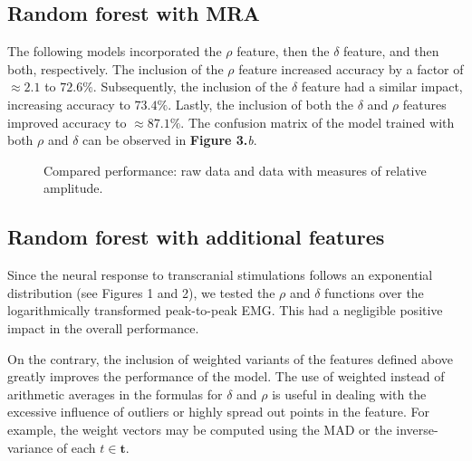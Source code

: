 \documentclass{article}
\begin{document}
\begin{multicols}{2}
\subsection{Random forest with MRA}

The following models incorporated the $\rho$ feature, then the $\delta$ feature,
and then both, respectively. The inclusion of the $\rho$ feature increased
accuracy by a factor of $\approx 2.1$ to $72.6\%$. Subsequently, the inclusion
of the $\delta$ feature had a similar impact, increasing accuracy to $73.4\%$.
Lastly, the inclusion of both the $\delta$ and $\rho$ features improved accuracy
to $\approx 87.1\%$. The confusion matrix of the model trained with both $\rho$
and $\delta$ can be observed in \textbf{Figure 3.}\textit{b}.

\begin{figure}[H]
  \centering
  \hfill
  \caption{Compared performance: raw data and data with measures of relative
  amplitude.}
  \label{fig:two_images}
\end{figure}


\subsection{Random forest with additional features}

Since the neural response to transcranial stimulations follows an exponential
distribution (see Figures 1 and 2), we tested the $\rho$ and $\delta$ functions
over the logarithmically transformed peak-to-peak EMG. This had a negligible
positive impact in the overall performance.

On the contrary, the inclusion of weighted variants of the features defined
above greatly improves the performance of the model. The use of weighted instead
of arithmetic averages in the formulas for $\delta$ and $\rho$ is useful in
dealing with the excessive influence of outliers or highly spread out points in
the feature. For example, the weight vectors may be computed using the MAD or
the inverse-variance of each $t \in \textbf{t}$. 


\end{multicols}
\end{document}
